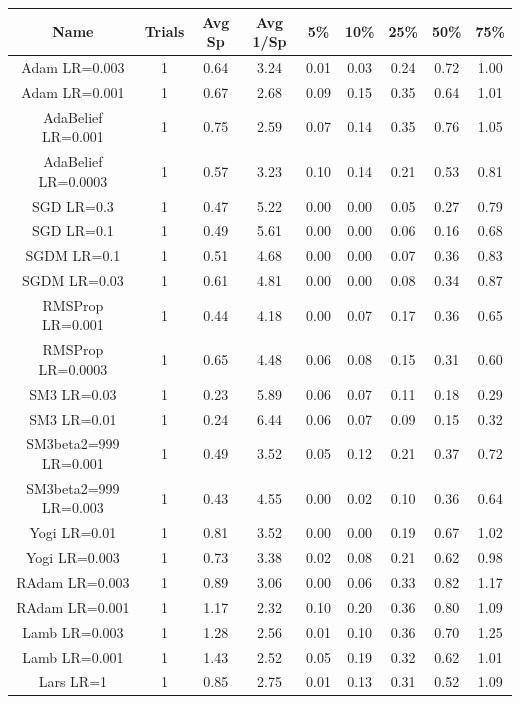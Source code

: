 \footnotesize
\begin{tabular}{||c c c c c c c c c||} 
     \hline
     Name & Trials & Avg Sp & Avg 1/Sp & 5\% & 10\% & 25\% & 50\% & 75\%  \\ [0.5ex] 
     \hline\hline
     
Adam LR=0.003 & 1 &0.64 & 3.24 & 0.01 & 0.03 & 0.24 & 0.72 & 1.00 \\
Adam LR=0.001 & 1 &0.67 & 2.68 & 0.09 & 0.15 & 0.35 & 0.64 & 1.01 \\
AdaBelief LR=0.001 & 1 &0.75 & 2.59 & 0.07 & 0.14 & 0.35 & 0.76 & 1.05 \\
AdaBelief LR=0.0003 & 1 &0.57 & 3.23 & 0.10 & 0.14 & 0.21 & 0.53 & 0.81 \\
SGD LR=0.3 & 1 &0.47 & 5.22 & 0.00 & 0.00 & 0.05 & 0.27 & 0.79 \\
SGD LR=0.1 & 1 &0.49 & 5.61 & 0.00 & 0.00 & 0.06 & 0.16 & 0.68 \\
SGDM LR=0.1 & 1 &0.51 & 4.68 & 0.00 & 0.00 & 0.07 & 0.36 & 0.83 \\
SGDM LR=0.03 & 1 &0.61 & 4.81 & 0.00 & 0.00 & 0.08 & 0.34 & 0.87 \\
RMSProp LR=0.001 & 1 &0.44 & 4.18 & 0.00 & 0.07 & 0.17 & 0.36 & 0.65 \\
RMSProp LR=0.0003 & 1 &0.65 & 4.48 & 0.06 & 0.08 & 0.15 & 0.31 & 0.60 \\
SM3 LR=0.03 & 1 &0.23 & 5.89 & 0.06 & 0.07 & 0.11 & 0.18 & 0.29 \\
SM3 LR=0.01 & 1 &0.24 & 6.44 & 0.06 & 0.07 & 0.09 & 0.15 & 0.32 \\
SM3beta2=999 LR=0.001 & 1 &0.49 & 3.52 & 0.05 & 0.12 & 0.21 & 0.37 & 0.72 \\
SM3beta2=999 LR=0.003 & 1 &0.43 & 4.55 & 0.00 & 0.02 & 0.10 & 0.36 & 0.64 \\
Yogi LR=0.01 & 1 &0.81 & 3.52 & 0.00 & 0.00 & 0.19 & 0.67 & 1.02 \\
Yogi LR=0.003 & 1 &0.73 & 3.38 & 0.02 & 0.08 & 0.21 & 0.62 & 0.98 \\
RAdam LR=0.003 & 1 &0.89 & 3.06 & 0.00 & 0.06 & 0.33 & 0.82 & 1.17 \\
RAdam LR=0.001 & 1 &1.17 & 2.32 & 0.10 & 0.20 & 0.36 & 0.80 & 1.09 \\
Lamb LR=0.003 & 1 &1.28 & 2.56 & 0.01 & 0.10 & 0.36 & 0.70 & 1.25 \\
Lamb LR=0.001 & 1 &1.43 & 2.52 & 0.05 & 0.19 & 0.32 & 0.62 & 1.01 \\
Lars LR=1 & 1 &0.85 & 2.75 & 0.01 & 0.13 & 0.31 & 0.52 & 1.09 \\

\end{tabular}
